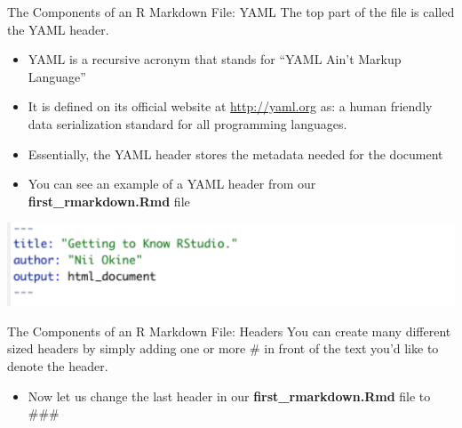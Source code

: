 \documentclass[
  ignorenonframetext,
]{beamer}
\providecommand{\tightlist}{%
  \setlength{\itemsep}{0pt}\setlength{\parskip}{0pt}}
\begin{document}
\begin{frame}{The Components of an R Markdown File: YAML}
\protect\hypertarget{the-components-of-an-r-markdown-file-yaml}{}
The top part of the file is called the YAML header.

\begin{itemize}
\item
  YAML is a recursive acronym that stands for ``YAML Ain't Markup
  Language''
\item
  It is defined on its official website at \url{http://yaml.org} as: a
  human friendly data serialization standard for all programming
  languages.
\item
  Essentially, the YAML header stores the metadata needed for the
  document
\item
  You can see an example of a YAML header from our
  \textbf{first\_rmarkdown.Rmd} file
\end{itemize}

\begin{center}\includegraphics[width=0.8\linewidth,height=0.2\textheight]{yaml} \end{center}
\end{frame}

\begin{frame}{The Components of an R Markdown File: Headers}
\protect\hypertarget{the-components-of-an-r-markdown-file-headers}{}
You can create many different sized headers by simply adding one or more
\# in front of the text you'd like to denote the header.





\begin{itemize}
\tightlist
\item
  Now let us change the last header in our \textbf{first\_rmarkdown.Rmd}
  file to \#\#\#
\end{itemize}
\end{frame}
\end{document}
